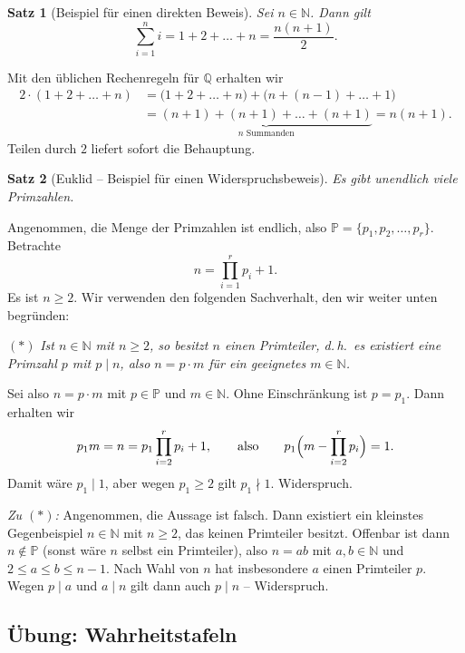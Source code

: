 \documentclass[a4paper]{article}
\makeatletter
\theoremstyle{kurzskript}
\newtheorem{satz}{Satz}[section]             %
\renewenvironment{proof}[1][\proofname]{\par\pushQED{\qed}%
  \normalfont\topsep\medskipamount\relax
  \trivlist\item[\hskip\labelsep\bfseries #1\@addpunct{.}]\ignorespaces}%
  {\popQED\endtrivlist\@endpefalse}
\renewcommand{\proofname}{Beweis}
\newcommand{\N}{\mathbb{N}}
\newcommand{\Q}{\mathbb{Q}}
\newcommand{\Pm}{\mathbb{P}}
\makeatother
\begin{document}
\begin{satz}[Beispiel für einen direkten Beweis]
Sei $n \in \N$. Dann gilt
\[
  \sum_{i=1}^{n} i = 1 + 2 + \dots + n = \frac{n(n+1)}{2}.
\]
\end{satz}

\begin{proof}
Mit den üblichen Rechenregeln für $\Q$ erhalten wir
\begin{align*}
  2 \cdot (1 + 2 + \dots + n)
  &= \bigl(1 + 2 + \dots + n\bigr) + \bigl(n + (n-1) + \dots + 1\bigr)\\
  &= \underbrace{(n+1) + (n+1) + \dots + (n+1)}_{n \text{ Summanden}} = n(n+1).
\end{align*}
Teilen durch $2$ liefert sofort die Behauptung.
\end{proof}

\begin{satz}[Euklid -- Beispiel für einen Widerspruchsbeweis]
Es gibt unendlich viele Primzahlen.
\end{satz}

\begin{proof}
Angenommen, die Menge der Primzahlen ist endlich, also $\Pm = \{p_1, p_2, \dots, p_r\}$. Betrachte
\[
  n = \prod_{i=1}^{r} p_i + 1.
\]
Es ist $n \geq 2$. Wir verwenden den folgenden Sachverhalt, den wir weiter unten begründen:

\smallskip
\noindent$(*)$ \emph{Ist $n \in \N$ mit $n \geq 2$, so besitzt $n$ einen Primteiler, d.\,h.\ es existiert eine Primzahl $p$ mit $p \mid n$, also $n = p \cdot m$ für ein geeignetes $m \in \N$.}
\smallskip

Sei also $n = p \cdot m$ mit $p \in \Pm$ und $m \in \N$. Ohne Einschränkung ist $p = p_1$. Dann erhalten wir
\[
  p_1 m = n = p_1 \prod_{i=2}^{r} p_i + 1,
  \qquad\text{also}\qquad
  p_1 \Bigl(m - \prod_{i=2}^{r} p_i\Bigr) = 1.
\]
Damit wäre $p_1 \mid 1$, aber wegen $p_1 \geq 2$ gilt $p_1 \nmid 1$. Widerspruch.

\smallskip
\emph{Zu $(*)$:} Angenommen, die Aussage ist falsch. Dann existiert ein kleinstes Gegenbeispiel $n \in \N$ mit $n \geq 2$, das keinen Primteiler besitzt. Offenbar ist dann $n \notin \Pm$ (sonst wäre $n$ selbst ein Primteiler), also $n = ab$ mit $a, b \in \N$ und $2 \leq a \leq b \leq n-1$. Nach Wahl von $n$ hat insbesondere $a$ einen Primteiler $p$. Wegen $p \mid a$ und $a \mid n$ gilt dann auch $p \mid n$ -- Widerspruch.
\end{proof}

\subsection*{Übung: Wahrheitstafeln}
\end{document}
